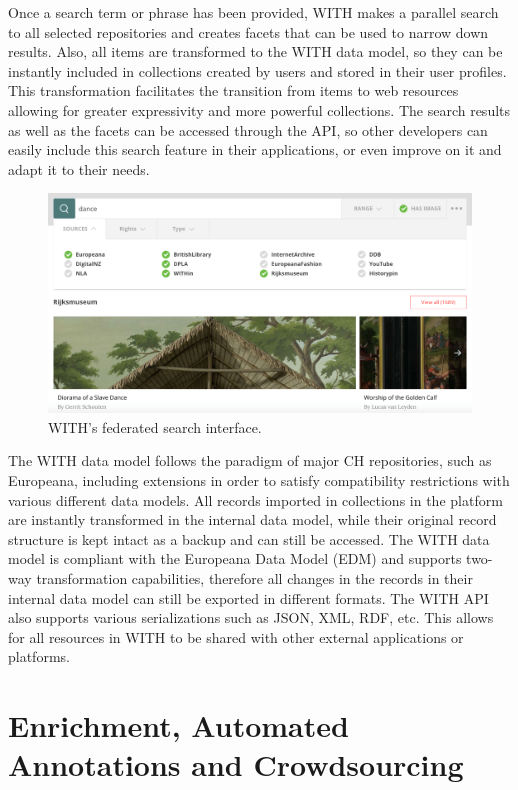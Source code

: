 \documentclass[runningheads,a4paper]{llncs}
\makeatletter
\def\maxwidth#1{\ifdim\Gin@nat@width>#1 #1\else\Gin@nat@width\fi}
\makeatother
\begin{document}
Once a search term or phrase has been provided, WITH makes a parallel search to all selected repositories and creates facets that can be used to narrow down results. Also, all items are transformed to the WITH data model, so they can be instantly included in collections created by users and stored in their user profiles. This transformation facilitates the transition from items to web resources allowing for greater expressivity and more powerful collections. The search results as well as the facets can be accessed through the API, so other developers can easily include this search feature in their applications, or even improve on it and adapt it to their needs. 
\begin{figure}[h!]
\centering
\includegraphics[width=\maxwidth{\textwidth}]{./img/image1.png}
\cprotect\caption{WITH's federated search interface.}
\label{figure1}
\end{figure}




The WITH data model follows the paradigm of major CH repositories, such as Europeana, including extensions in order to satisfy compatibility restrictions with various different data models. All records imported in collections in the platform are instantly transformed in the internal data model, while their original record structure is kept intact as a backup and can still be accessed. The WITH data model is compliant with the Europeana Data Model (EDM)  \cite{_Ref490496623} and supports two-way transformation capabilities, therefore all changes in the records in their internal data model can still be exported in different formats. The WITH API also supports various serializations such as JSON, XML, RDF, etc. This allows for all resources in WITH to be shared with other external applications or platforms.

\section{Enrichment, Automated Annotations and Crowdsourcing}
\end{document}
